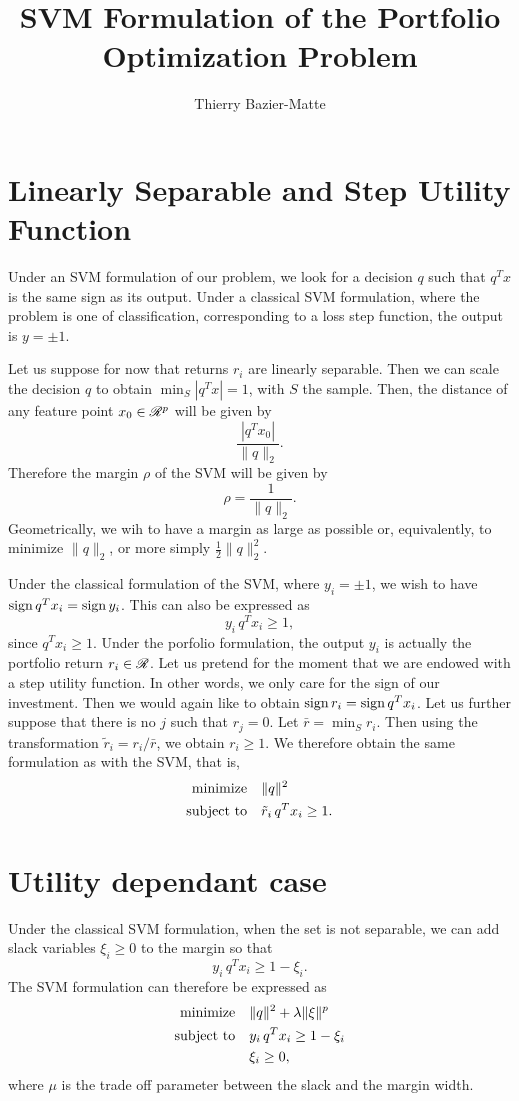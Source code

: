 \documentclass{article}
\title{SVM Formulation of the Portfolio Optimization Problem}
\author{Thierry Bazier-Matte}
\begin{document}
\maketitle

\section{Linearly Separable and Step Utility Function}


Under an SVM formulation of our problem, we look for a decision $q$ such that $q^Tx$ is
the same sign as its output. Under a classical SVM formulation, where the problem is one
of classification, corresponding to a loss step function, the output is $y=\pm 1$.

Let us suppose for now that returns $r_i$ are linearly separable. Then we can scale the
decision $q$ to obtain $\min_S|q^Tx| = 1$, with $S$ the sample. Then, the distance of any
feature point $x_0\in\mathscr{R}^p$ will be given by
\[
  \frac{|q^Tx_0|}{\|q\|_2}.
\]
Therefore the margin $\rho$ of the SVM will be given by
\[
  \rho = \frac{1}{\|q\|_2}.
\]
Geometrically, we wih to have a margin as large as possible or, equivalently, to minimize
$\|q\|_2$, or more simply $\frac{1}{2}\|q\|^2_2$. 

Under the classical formulation of the SVM, where $y_i=\pm1$, we wish to have $\operatorname{sign}
q^Tx_i = \operatorname{sign} y_i$. This can also be expressed as
\[
  y_i\,q^Tx_i \geq 1,
\]
since $q^Tx_i\geq1$. Under the porfolio formulation, the output $y_i$ is actually the
portfolio return $r_i\in\mathscr{R}$. Let us pretend for the moment that we are endowed with a
step utility function. In other words, we only care for the sign of our investment. Then
we would again like to obtain $\operatorname{sign} r_i = \operatorname{sign} q^Tx_i$. Let us further suppose that
there is no $j$ such that $r_j=0$. Let $\bar r = \min_S r_i$. Then using the
transformation $\tilde r_i = r_i/\bar r$, we obtain $r_i \geq 1$. We therefore obtain the
same formulation as with the SVM, that is,
\begin{align*}
  \minimizeEquationSt{\|q\|^2}{\tilde r_i\,q^Tx_i\geq 1}.
\end{align*}


\section{Utility dependant case}

Under the classical SVM formulation, when the set is not separable, we can add slack
variables $\xi_i\geq 0$ to the margin so that
\[
  y_i\,q^Tx_i \geq 1 - \xi_i.
\]
The SVM formulation can therefore be expressed as
\begin{align*}
  \minimizeEquationSt{\|q\|^2+\lambda\|\xi\|^p}[y_i\,q^Tx_i\geq 1-\xi_i\\,\xi_i\geq 0],
\end{align*}
where $\mu$ is the trade off parameter between the slack and the margin width.
\end{document}
